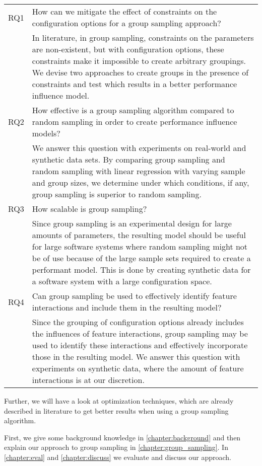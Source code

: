 \documentclass[../thesis.tex]{subfiles}
\begin{document}
\begingroup
\renewcommand{\arraystretch}{1.5}
\begin{flushleft}
    \begin{tabular}{lp{}}
        RQ1 & How can we mitigate the effect of constraints on the configuration options for a group sampling approach?                \\
            & In literature, in group sampling, constraints on the parameters are non-existent,
        but with configuration options, these constraints make it impossible to create arbitrary groupings.
        We devise two approaches to create groups in the presence of constraints and test which
        results in a better performance influence model.                                                                               \\

        RQ2 & How effective is a group sampling algorithm compared to random sampling in order to create performance influence models? \\
            & We answer this question with experiments on real-world and synthetic data sets.
        By comparing group sampling and random sampling with linear regression with varying sample and group sizes,
        we determine under which conditions, if any, group sampling is superior to random sampling.                                    \\

        RQ3 & How scalable is group sampling?                                                                                          \\
            & Since group sampling is an experimental design for large amounts of parameters, the resulting model should be useful
        for large software systems where random sampling might not be of use because of the large sample sets required to create a
        performant model. This is done by creating synthetic data for a software system with a large configuration space.              \\

        RQ4 & Can group sampling be used to effectively identify feature interactions and include them in the resulting model?         \\
            & Since the grouping of configuration options already includes the influences of feature interactions,
        group sampling may be used to identify these interactions and effectively incorporate those in the resulting model.
        We answer this question with experiments on synthetic data, where the amount of feature interactions is at our discretion.     \\
    \end{tabular}
\end{flushleft}
\endgroup


Further, we will have a look at optimization techniques, which are already described in literature to get better results when
using a group sampling algorithm.

First, we give some background knowledge in \autoref{chapter:background} and then explain our approach to group sampling in
\autoref{chapter:group_sampling}. In \autoref{chapter:eval}
and \autoref{chapter:discuss} we evaluate and discuss our approach.
\end{document}
